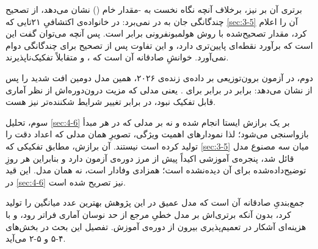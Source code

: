 برتری آن بر  نیز، برخلاف آنچه نگاه نخست به -مقدار خام
() نشان می‌دهد، از تصحیح چندگانگی جان به در نمی‌برد: در خانواده‌ی اکتشافیِ
۲۱تایی که \cref{sec:3-5} آن را اعلام کرد، مقدار تصحیح‌شده با روش هولمبونفرونی برابر
 است. پس آنچه می‌توان گفت این است که  برآورد نقطه‌ای پایین‌تری
دارد، و این تفاوت پس از تصحیح برای چندگانگی دوام نمی‌آورد. خوانشِ صادقانه آن است که
،  و  متقابلاً تفکیک‌ناپذیرند.

دوم، در آزمون برون‌توزیعی بر داده‌ی زنده‌ی ۲۰۲۶، همین مدل دومین افت شدید را پس از
 نشان می‌دهد:  برابر  در برابر  برای
. یعنی مدلی که مزیت درون‌دوره‌اش از نظر آماری قابل تفکیک نبود، در
برابر تغییر شرایط شکننده‌تر نیز هست.

سوم، تحلیل  \cref{sec:4-6} بر یک برازش ایستا انجام شده و نه بر مدلی که در هر مبدأ
بازواسنجی می‌شود؛ لذا نمودارهای اهمیت ویژگی، تصویرِ همان مدلی که اعداد دقت را تولید
کرده است نیستند. آن برازش، مطابق تفکیکی که \cref{sec:3-5} میان سه مصنوع مدل قائل شد، پنجره‌ی
آموزشی اکیداً پیش از مرز دوره‌ی آزمون دارد و بنابراین هر روزِ توضیح‌داده‌شده برای آن
دیده‌نشده است؛ همزادی وفادار است، نه همان مدل. این قید در \cref{sec:4-6} نیز تصریح شده است.

جمع‌بندیِ صادقانه آن است که مدل عمیق در این پژوهش بهترین عدد میانگین را تولید کرد،
بدون آنکه برتری‌اش بر مدل خطیِ مرجع از حد نوسان آماری فراتر رود، و با هزینه‌ای آشکار
در تعمیم‌پذیری بیرون از دوره‌ی آموزش. تفصیل این بحث در بخش‌های ۴-۵ و ۵-۲ می‌آید.
